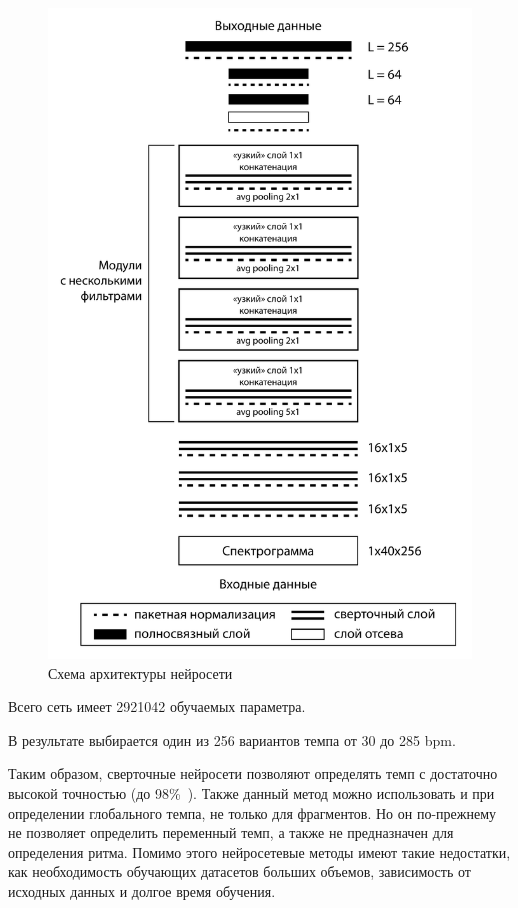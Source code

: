 \begin{figure}[h!]
	\begin{center}
		\includegraphics[scale=0.33]{svg/cnn.pdf}
	\end{center}
	\captionsetup{justification=centering}
	\caption{Схема архитектуры нейросети}
	\label{img:cnn}
\end{figure}

\newpage

Всего сеть имеет 2921042 обучаемых параметра.

В результате выбирается один из 256 вариантов темпа от 30 до 285 bpm.

Таким образом, сверточные нейросети позволяют определять темп с достаточно высокой точностью (до 98\%~\cite{cnn}). Также данный метод можно использовать и при определении глобального темпа, не только для фрагментов. Но он по-прежнему не позволяет определить переменный темп, а также не предназначен для определения ритма. Помимо этого нейросетевые методы имеют такие недостатки, как необходимость обучающих датасетов больших объемов, зависимость от исходных данных и долгое время обучения.

